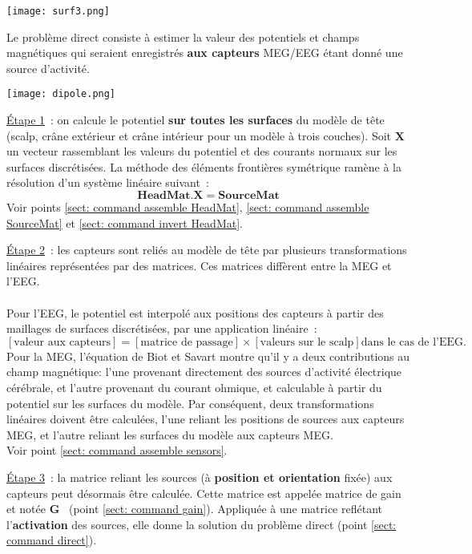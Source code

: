 \centerline{\texttt{[image: surf3.png]}}

\noindent
Le problème direct consiste à estimer la valeur des potentiels et champs magnétiques qui seraient enregistrés \textbf{aux
capteurs} MEG/EEG étant donné une source d'activité.

\centerline{\texttt{[image: dipole.png]}}

\noindent
\underline{Étape 1}~: on calcule le potentiel \textbf{sur toutes les surfaces } du modèle de tête (scalp, crâne extérieur et crâne intérieur pour un modèle à trois couches). Soit $\mathbf{X}$ un vecteur rassemblant  les valeurs du potentiel et des courants normaux sur les surfaces discrétisées. La méthode des éléments
frontières symétrique ramène à la résolution d'un système linéaire
suivant~:
\[
    \mathbf{HeadMat} . \mathbf{X} = \mathbf{SourceMat}
\]
Voir points \ref{sect: command assemble HeadMat}, \ref{sect: command assemble SourceMat} et \ref{sect: command invert HeadMat}.

\medskip

\noindent
\underline{Étape 2}~: les capteurs sont reliés au modèle de tête par plusieurs transformations linéaires représentées par des matrices. Ces matrices diffèrent entre la MEG et l'EEG. \\
\\
Pour l'EEG, le potentiel est interpolé aux positions des capteurs à partir des maillages de surfaces discrétisées, par une application linéaire~:\\
\[
    \left[ \mbox{valeur aux capteurs} \right] =
    \left[ \mbox{matrice de passage} \right] \times \left[ \mbox{valeurs sur le scalp} \right] \mbox{dans le cas de l'EEG.}
\]
Pour la MEG, l'équation de Biot et Savart montre qu'il y a deux contributions au champ magnétique: l'une provenant directement des sources d'activité électrique cérébrale, et l'autre provenant du courant ohmique, et calculable à partir du potentiel sur les surfaces du modèle.
Par conséquent, deux transformations linéaires doivent être calculées, l'une reliant les positions de sources aux capteurs MEG, et l'autre reliant les surfaces du modèle aux capteurs MEG.\\

\noindent
Voir point \ref{sect: command assemble sensors}.

\medskip

\noindent
\underline{Étape 3}~: la matrice reliant les sources (à \textbf{position et orientation} fixée)  aux capteurs peut désormais être calculée. Cette matrice
est appelée matrice de gain et notée $\mathbf{G}$~ (point \ref{sect: command gain}). 
Appliquée à une matrice reflétant l'\textbf{activation} des sources, elle donne la solution du problème direct (point
\ref{sect: command direct}).
